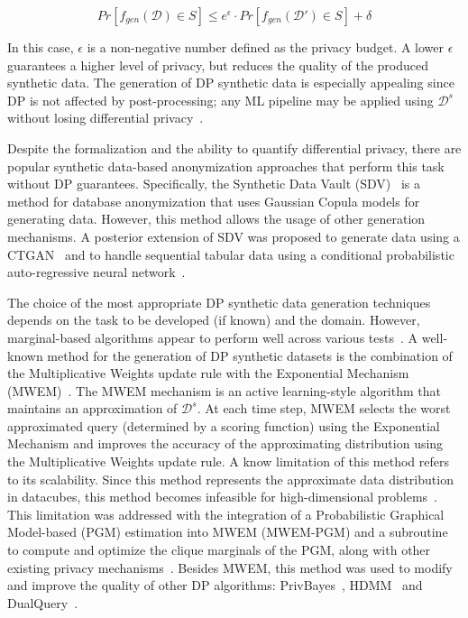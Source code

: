 \documentclass[parskip=full]{scrartcl}
\begin{document}
\begin{equation}
    Pr[f_{gen}(\mathcal{D}) \in S] \le e^{\epsilon} \cdot
    Pr[f_{gen}(\mathcal{D}') \in S] + \delta
\end{equation}
 
In this case, $\epsilon$ is a non-negative number defined as the privacy
budget. A lower $\epsilon$ guarantees a higher level of privacy, but reduces
the quality of the produced synthetic data. The generation of DP synthetic
data is especially appealing since DP is not affected by post-processing; any
ML pipeline may be applied using $\mathcal{D}^s$ without losing differential
privacy~\cite{dwork2014algorithmic}.

Despite the formalization and the ability to quantify differential privacy,
there are popular synthetic data-based anonymization approaches that perform
this task without DP guarantees. Specifically, the Synthetic Data Vault
(SDV)~\cite{patki2016synthetic} is a method for database anonymization that
uses Gaussian Copula models for generating data. However, this method allows
the usage of other generation mechanisms. A posterior extension of SDV was
proposed to generate data using a CTGAN~\cite{xu2019modeling} and to handle
sequential tabular data using a conditional probabilistic auto-regressive
neural network~\cite{zhang2022sequential}. 

The choice of the most appropriate DP synthetic data generation techniques
depends on the task to be developed (if known) and the domain. However,
marginal-based algorithms appear to perform well across various
tests~\cite{tao2021benchmarking}. A well-known method for the generation of DP
synthetic datasets is the combination of the Multiplicative Weights update
rule with the Exponential Mechanism (MWEM)~\cite{hardt2012simple}. The MWEM
mechanism is an active learning-style algorithm that maintains an
approximation of $\mathcal{D}^s$. At each time step, MWEM selects the worst
approximated query (determined by a scoring function) using the Exponential
Mechanism and improves the accuracy of the approximating distribution using
the Multiplicative Weights update rule. A know limitation of this method
refers to its scalability. Since this method represents the approximate data
distribution in datacubes, this method becomes infeasible for high-dimensional
problems~\cite{mckenna2019graphical}. This limitation was addressed with the
integration of a Probabilistic Graphical Model-based (PGM) estimation into
MWEM (MWEM-PGM) and a subroutine to compute and optimize the clique marginals
of the PGM, along with other existing privacy
mechanisms~\cite{mckenna2019graphical}. Besides MWEM, this method was used to
modify and improve the quality of other DP algorithms:
PrivBayes~\cite{zhang2017privbayes}, HDMM~\cite{mckenna2018optimizing} and
DualQuery~\cite{gaboardi2014dual}.
\end{document}
